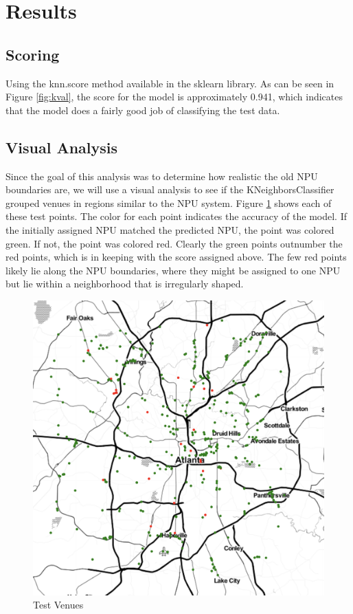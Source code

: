 \documentclass[11pt]{amsart}
\begin{document}
\section{Results}
\subsection{Scoring}
Using the knn.score method available in the sklearn library. As can be seen in Figure \ref{fig:kval}, the score for the model is approximately 0.941, which indicates that the model does a fairly good job of classifying the test data. 
\subsection{Visual Analysis}
Since the goal of this analysis was to determine how realistic the old NPU boundaries are, we will use a visual analysis to see if the KNeighborsClassifier grouped venues in regions similar to the NPU system. Figure \ref{fig:preds} shows each of these test points. The color for each point indicates the accuracy of the model. If the initially assigned NPU matched the predicted NPU, the point was colored green. If not, the point was colored red. Clearly the green points outnumber the red points, which is in keeping with the score assigned above. 
The few red points likely lie along the NPU boundaries, where they might be assigned to one NPU but lie within a neighborhood that is irregularly shaped. 

\begin{figure}[h]
\includegraphics[width=\textwidth]{predictions}
\caption{Test Venues}
\label{fig:preds}
\end{figure}
\end{document}

